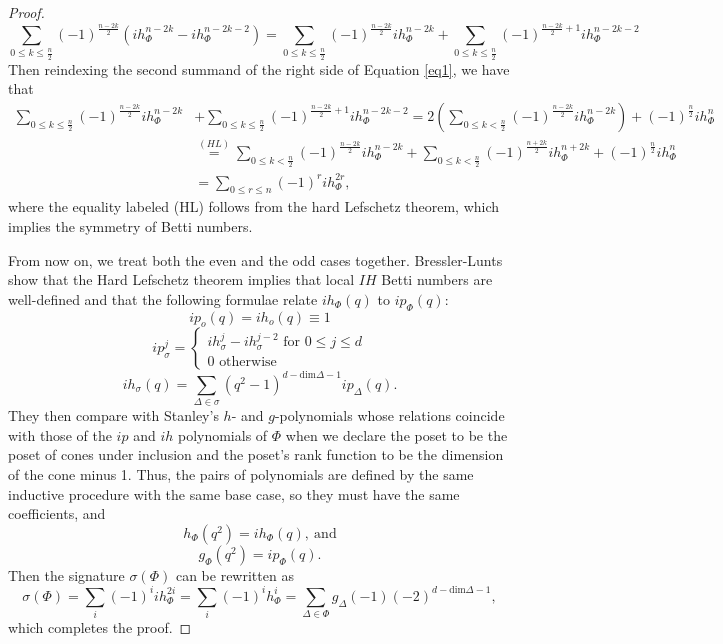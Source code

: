 \documentclass[12pt,leqno,twoside]{amsart}
\begin{document}
\begin{proof}
\begin{equation}\label{eq1}
    \sum_{0\leq k\leq \frac{n}{2}}(-1)^\frac{n-2k}{2}(ih_\Phi^{n-2k}-ih_\Phi^{n-2k-2})=\sum_{0\leq k\leq \frac{n}{2}}(-1)^\frac{n-2k}{2}ih_\Phi^{n-2k}+\sum_{0\leq k\leq \frac{n}{2}}(-1)^{\frac{n-2k}{2}+1}ih_\Phi^{n-2k-2}
\end{equation}
Then reindexing the second summand of the right side of Equation \ref{eq1}, we have that
\begin{equation*}
\begin{split}
    \sum_{0\leq k\leq \frac{n}{2}}(-1)^\frac{n-2k}{2}ih_\Phi^{n-2k}&+\sum_{0\leq k\leq \frac{n}{2}}(-1)^{\frac{n-2k}{2}+1}ih_\Phi^{n-2k-2}=2\left(\sum_{0\leq k< \frac{n}{2}}(-1)^\frac{n-2k}{2}ih_\Phi^{n-2k}\right)+(-1)^{\frac{n}{2}} ih_\Phi^n \\
&   \overset{(HL)}{=}\sum_{0\leq k< \frac{n}{2}}(-1)^\frac{n-2k}{2}ih_\Phi^{n-2k}+\sum_{0\leq k< \frac{n}{2}}(-1)^\frac{n+2k}{2}ih_\Phi^{n+2k}+(-1)^{\frac{n}{2}} ih_\Phi^n \\
&    =\sum_{0\leq r\leq n}(-1)^rih_\Phi^{2r},
\end{split}
\end{equation*}
where the equality labeled (HL) follows from the hard Lefschetz theorem, which implies the symmetry of Betti numbers.

From now on, we treat both the even and the odd cases together. Bressler-Lunts show that the Hard Lefschetz theorem implies that local $IH$ Betti numbers are well-defined \cite[Corollary 7.4]{BL} and that the following formulae \cite[Proposition 7.7]{BL} relate $ih_\Phi(q)$ to $ip_\Phi(q)$:
\[ip_o(q)=ih_o(q)\equiv1\]
\[ip^j_\sigma=\begin{cases}
                ih_\sigma^j-ih_\sigma^{j-2} \text{ for } 0\leq j\leq d  \\
                0 \text{ otherwise}
                 \end{cases}
\]
\[ih_\sigma(q)=\sum_{\Delta\in\sigma}(q^2-1)^{d-\text{dim}\Delta-1}ip_\Delta(q).\]
They then compare with Stanley's $h$- and $g$-polynomials whose relations coincide with those of the $ip$ and $ih$ polynomials of $\Phi$ when we declare the poset to be the poset of cones under inclusion and the poset's rank function to be the dimension of the cone minus 1. Thus, the pairs of polynomials are defined by the same inductive procedure with the same base case, so they must have the same coefficients, and $$h_\Phi(q^2)=ih_\Phi(q),\ \text{{and}}$$
$$g_\Phi(q^2)=ip_\Phi(q).$$
Then the signature $\sigma(\Phi)$ can be rewritten as
$$\sigma(\Phi)=\sum_i(-1)^iih_\Phi^{2i}=\sum_i(-1)^ih_\Phi^{i}=\sum_{\Delta\in\Phi} g_\Delta(-1)(-2)^{d-\text{dim}\Delta-1},$$
which completes the proof.
\end{proof}
\end{document}

